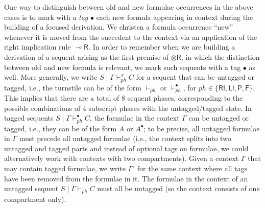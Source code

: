 \documentclass[copyright,creativecommons]{eptcs}
\theoremstyle{definition}
\newcommand{\tr}{\otimes \mathsf{R}}
\newcommand{\lright}{{\multimap}\mathsf{R}}
\newcommand{\RI}{\mathsf{RI}}
\newcommand{\LI}{\mathsf{LI}}
\newcommand{\Pass}{\mathsf{P}}
\newcommand{\F}{\mathsf{F}}
\newcommand{\xvdash}{\vdash^{x}}
\begin{document}
One way to distinguish between old and new formulae occurrences in the above cases is to mark with a \emph{tag} $\bullet$ each new formula appearing in context during the building of a focused derivation. We christen a formula occurrence ``new'' whenever it is moved from the succedent to the context via an application of the right implication rule $\lright$. In order to remember when we are building a derivation of a sequent arising as the first premise of $\tr$, in which the distinction between old and new formula is relevant, we mark such sequents with a tag $\bullet$ as well.
More generally, we write $S \mid \Gamma \xvdash_{ph} C$ for a sequent that can be untagged or tagged, i.e., the turnstile can be of the form $\vdash_{ph}$ or $\vdash^\bullet_{ph}$, for $ph \in \{ \RI,\LI,\Pass,\F\}$. This implies that there are a total of 8 sequent phases, corresponding to the possible combinations of 4 subscript phases with the untagged/tagged state.
In tagged sequents  $S \mid \Gamma \vdash_{ph}^{\bullet} C$, the formulae in the context $\Gamma$ can be untagged or tagged, i.e., they can be of the form $A$ or $A^\bullet$; to be precise, all untagged formulae in $\Gamma$ must precede all untagged formulae (i.e., the context splits into two untagged and tagged parts and instead of optional tags on formulae, we could alternatively work with contexts with two compartments). Given a context $\Gamma$ that may contain tagged formulae, we write $\Gamma^{\circ}$ for the same context where all tags have been removed from the formulae in it. The formulae in the context of an untagged sequent $S \mid \Gamma \vdash_{ph} C$ must all be untagged (so the context consists of one compartment only).
\end{document}
